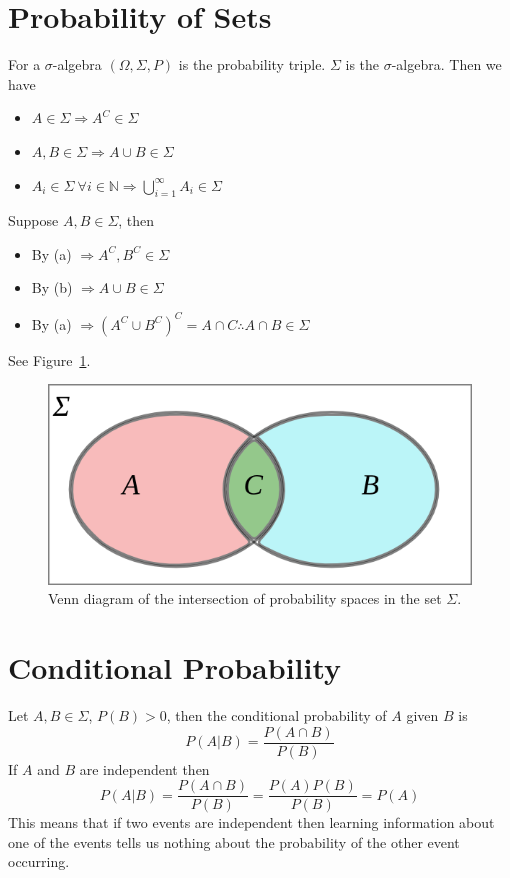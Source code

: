 \mainmatter%
\setcounter{page}{1}

\lectureseries[\course]{\course}

\date{October 6, 2009}

\setaddress%

\setcounter{lecture}{2}
\setcounter{chapter}{2}


\section{Probability of Sets}
For a $\sigma$-algebra $(\Omega, \Sigma, P)$ is the probability triple.
$\Sigma$ is the $\sigma$-algebra.
Then we have
\begin{itemize}
\item $A\in\Sigma \Rightarrow A^C\in\Sigma$
\item $A, B\in\Sigma \Rightarrow A\cup B\in\Sigma$
\item $A_i\in\Sigma~\forall i\in\mathbb{N} \Rightarrow \bigcup_{i=1}^\infty A_i\in\Sigma$
\end{itemize}
Suppose $A,B\in\Sigma$, then
\begin{itemize}
\item By (a) $\Rightarrow A^C,B^C\in\Sigma$
\item By (b) $\Rightarrow A\cup B\in\Sigma$
\item By (a) $\Rightarrow {(A^C\cup B^C)}^C = A\cap C \therefore A\cap B\in\Sigma$
\end{itemize}
See Figure~\ref{fig:03vennProb}.

\begin{figure}[ht!]
\centering
\includegraphics[width=.5\textwidth]{images/03vennProb}
\caption{Venn diagram of the intersection of probability spaces in the set $\Sigma$.}
\label{fig:03vennProb}
\end{figure}

\section{Conditional Probability}
Let $A,B\in\Sigma$, $P(B)>0$, then the conditional probability of $A$ given $B$ is
$$P(A|B) = \frac{P(A\cap B)}{P(B)}$$
If $A$ and $B$ are independent then
$$P(A|B) = \frac{P(A\cap B)}{P(B)} = \frac{P(A)P(B)}{P(B)} = P(A)$$
This means that if two events are independent then learning information about one of the events tells us nothing about the probability of the other event occurring.

